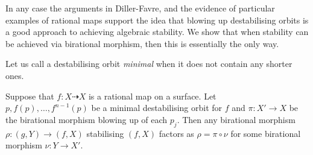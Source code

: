 \documentclass[11pt, final]{amsart}
\newcommand{\dashto}{\dashrightarrow}
\begin{document}

In any case the arguments in Diller-Favre, and the evidence of particular examples of rational maps \cite{BK06, BKTAM, BK10, Fav} support the idea that blowing up destabilising orbits is a good approach to achieving algebraic stability. We show that when stability can be achieved via birational morphism, then this is essentially the only way.

Let us call a destabilising orbit \emph{minimal} when it does not contain any shorter ones.

\begin{prop}\label{prop:minorbit}
 Suppose that $f: X \dashto X$ is a rational map on a surface. Let\\$p, f(p), \dots, f^{n-1}(p)$ be a minimal destabilising orbit for $f$ and $\pi : X' \to X$ be the birational morphism blowing up of each $p_j$. Then any birational morphism $\rho : (g, Y) \to (f, X)$ stabilising $(f, X)$ factors as %
 $\rho = \pi \circ \nu$ for some birational morphism $\nu : Y \to X'$. %
\end{prop}
\end{document}
